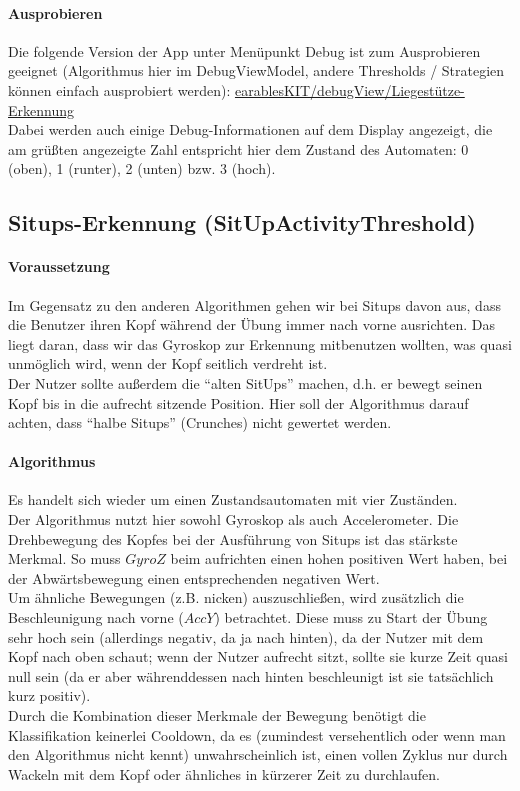 \documentclass[a4paper,12pt]{article}
\begin{document}
\paragraph{Ausprobieren}
Die folgende Version der App unter Menüpunkt Debug ist zum Ausprobieren geeignet (Algorithmus hier im DebugViewModel, andere Thresholds / Strategien können einfach ausprobiert werden): 
\href{https://github.com/vlle1/earablesKIT/commit/6a4999ac8e2613298a6e6dd9bc85092ddd1b6133}{earablesKIT/debugView/Liegestütze-Erkennung}\\
Dabei werden auch einige Debug-Informationen auf dem Display angezeigt, die am grüßten angezeigte Zahl entspricht hier dem Zustand des Automaten: 0 (oben), 1 (runter), 2 (unten) bzw. 3 (hoch).

\subsection{Situps-Erkennung (SitUpActivityThreshold)}
\paragraph{Voraussetzung} 
Im Gegensatz zu den anderen Algorithmen gehen wir bei Situps davon aus, dass die Benutzer ihren Kopf während der Übung immer nach vorne ausrichten. Das liegt daran, dass wir das Gyroskop zur Erkennung mitbenutzen wollten, was quasi unmöglich wird, wenn der Kopf seitlich verdreht ist.\\
Der Nutzer sollte außerdem die ``alten SitUps'' machen, d.h. er bewegt seinen Kopf bis in die aufrecht sitzende Position. Hier soll der Algorithmus darauf achten, dass ``halbe Situps'' (Crunches) nicht gewertet werden.
\paragraph{Algorithmus}
Es handelt sich wieder um einen Zustandsautomaten mit vier Zuständen.\\
Der Algorithmus nutzt hier sowohl Gyroskop als auch Accelerometer. Die Drehbewegung des Kopfes bei der Ausführung von Situps ist das stärkste Merkmal. So muss $GyroZ$ beim aufrichten einen hohen positiven Wert haben, bei der Abwärtsbewegung einen entsprechenden negativen Wert.\\
Um ähnliche Bewegungen (z.B. nicken) auszuschließen, wird zusätzlich die Beschleunigung nach vorne ($AccY$) betrachtet. Diese muss zu Start der Übung sehr hoch sein (allerdings negativ, da ja nach hinten), da der Nutzer mit dem Kopf nach oben schaut; wenn der Nutzer aufrecht sitzt, sollte sie kurze Zeit quasi null sein (da er aber währenddessen nach hinten beschleunigt ist sie tatsächlich kurz positiv).\\
Durch die Kombination dieser Merkmale der Bewegung benötigt die Klassifikation keinerlei Cooldown, da es (zumindest versehentlich oder wenn man den Algorithmus nicht kennt) unwahrscheinlich ist, einen vollen Zyklus nur durch Wackeln mit dem Kopf oder ähnliches in kürzerer Zeit zu durchlaufen.
\end{document}
